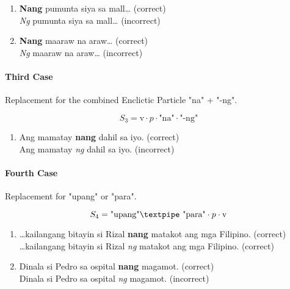 \begin{enumerate}
      \item \textbf{Nang} pumunta siya sa mall… (correct)
            \\ \textit{Ng} pumunta siya sa mall… (incorrect)
      \item \textbf{Nang} maaraw na araw… (correct)
            \\ \textit{Ng} maaraw na araw… (incorrect)
\end{enumerate}

\paragraph{Third Case} Replacement for the combined Enclictic Particle "na" + "-ng".

\[
      S_3 = \text{v} \cdot p \cdot \text{"na"} \cdot \text{"-ng"}
\]

\begin{example}

\end{example}

\begin{enumerate}
      \item Ang mamatay \textbf{nang} dahil sa iyo. (correct)
            \\ Ang mamatay \textit{ng} dahil sa iyo. (incorrect)
\end{enumerate}

\paragraph{Fourth Case} Replacement for "upang" or "para".

\[
      S_4 = \text{"upang"\textpipe "para"} \cdot p \cdot \text{v}
\]

\begin{example}

\end{example}

\begin{enumerate}
      \item …kailangang bitayin si Rizal \textbf{nang} matakot ang mga Filipino. (correct)
            \\ …kailangang bitayin si Rizal \textit{ng} matakot ang mga Filipino. (correct)
      \item Dinala si Pedro sa ospital \textbf{nang} magamot. (correct)
            \\ Dinala si Pedro sa ospital \textit{ng} magamot. (incorrect)
\end{enumerate}

